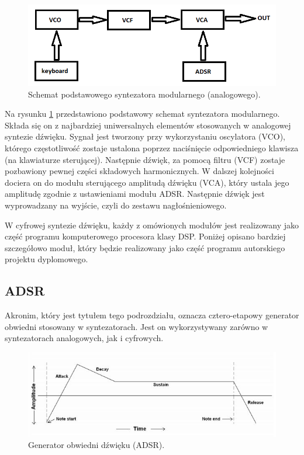 \begin{figure}[H]
	\centering
	\includegraphics[width=12cm]{./grafiki/analog_synth_scheme}
	\captionsetup{justification=centering}
	\caption{Schemat podstawowego syntezatora modularnego (analogowego).}
	\label{rys:analog_scheme}
\end{figure}

Na rysunku \ref{rys:analog_scheme} przedstawiono podstawowy schemat syntezatora modularnego. Składa się on z najbardziej uniwersalnych elementów stosowanych w analogowej syntezie dźwięku. Sygnał jest tworzony przy wykorzystaniu oscylatora (VCO), którego częstotliwość zostaje ustalona poprzez naciśnięcie odpowiedniego klawisza (na klawiaturze sterującej). Następnie dźwięk, za pomocą filtru (VCF) zostaje pozbawiony pewnej części składowych harmonicznych. W dalszej kolejności dociera on do modułu sterującego amplitudą dźwięku (VCA), który ustala jego amplitudę zgodnie z ustawieniami modułu ADSR. Następnie dźwięk jest wyprowadzany na wyjście, czyli do zestawu nagłośnieniowego.

W cyfrowej syntezie dźwięku, każdy z omówionych modułów jest realizowany jako część programu komputerowego procesora klasy DSP. Poniżej opisano bardziej szczegółowo moduł, który będzie realizowany jako część programu autorskiego projektu dyplomowego.

\subsection{ADSR}
Akronim, który jest tytułem tego podrozdziału, oznacza cztero-etapowy generator obwiedni stosowany w syntezatorach. Jest on wykorzystywany zarówno w syntezatorach analogowych, jak i cyfrowych.

\begin{figure}[H]
	\centering
	\includegraphics[width=15cm]{./grafiki/ADSR}
	\captionsetup{justification=centering}
	\caption{Generator obwiedni dźwięku (ADSR).}
	\label{rys:ADSR}
\end{figure}

